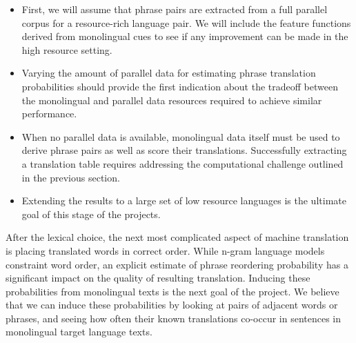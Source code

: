 \documentclass{article}
\begin{document}
\begin{itemize}
  \item First, we will assume that phrase pairs are extracted from a full parallel corpus for a resource-rich language pair.  We will include the feature functions derived from monolingual cues to see if any improvement can be made in the high resource setting.
  \item Varying the amount of parallel data for estimating phrase translation probabilities should provide the first indication about the tradeoff between the monolingual and parallel data resources required to achieve similar performance.  
  \item When no parallel data is available, monolingual data itself must be used to derive phrase pairs as well as score their translations.  Successfully extracting a translation table requires addressing the computational challenge outlined in the previous section.
  \item Extending the results to a large set of low resource languages is the ultimate goal of this stage of the projects.\\
\end{itemize}

After the lexical choice, the next most complicated aspect of machine translation is placing translated words in correct order.  While n-gram language models constraint word order, an explicit estimate of phrase reordering probability has a significant impact on the quality of resulting translation.  Inducing these probabilities from monolingual texts is the next goal of the project.  We believe that we can induce these probabilities by looking at pairs of adjacent words or phrases, and seeing how often their known translations co-occur in sentences in monolingual target language texts.  




 
\end{document}
